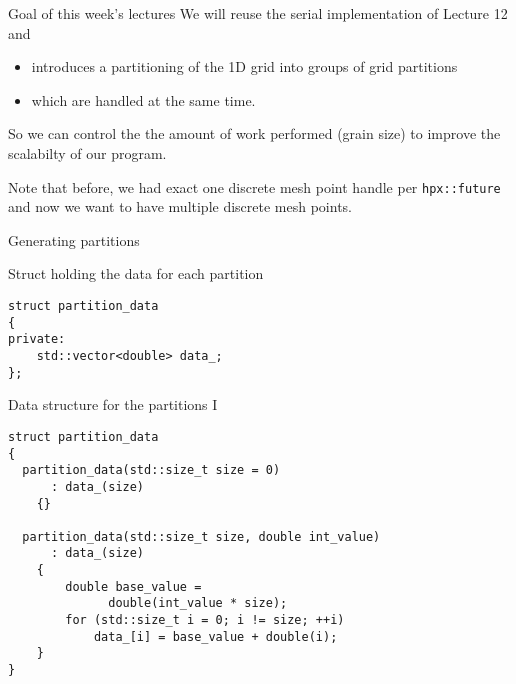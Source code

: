 \documentclass[\classoption]{beamer}
\begin{document}
\begin{frame}{Goal of this week's lectures}
We will reuse the serial implementation of Lecture 12 and

\begin{itemize}
\item introduces a partitioning of the 1D grid into groups of grid partitions
\item which are handled at the same time.
\end{itemize}
So we can control the the amount of work performed (grain size) to improve the scalabilty of our program. \\
\vspace{0.25cm}

Note that before, we had exact one discrete mesh point handle per \lstinline|hpx::future| and now we want to have multiple discrete mesh points. 
\end{frame}

\begin{frame}[fragile]{Generating partitions}

\begin{center}
\end{center}

\begin{block}{Struct holding the data for each partition}
\begin{lstlisting}
struct partition_data
{
private:
    std::vector<double> data_;
};
\end{lstlisting}
\end{block}

\end{frame}

\begin{frame}[fragile]{Data structure for the partitions I}

\begin{lstlisting}
struct partition_data
{
  partition_data(std::size_t size = 0)
      : data_(size)
    {}

  partition_data(std::size_t size, double int_value)
      : data_(size)
    {
        double base_value = 
              double(int_value * size);
        for (std::size_t i = 0; i != size; ++i)
            data_[i] = base_value + double(i);
    }
}
\end{lstlisting}


\end{frame}
\end{document}
